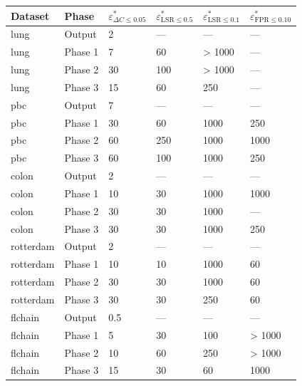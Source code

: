 \begin{tabular}{llllll}
  \toprule
Dataset & Phase & $\varepsilon^*_{\Delta C \leq 0.05}$ & $\varepsilon^*_{\text{LSR} \leq 0.5}$ & $\varepsilon^*_{\text{LSR} \leq 0.1}$ & $\varepsilon^*_{\text{FPR} \leq 0.10}$ \\ 
  \midrule
lung & Output & 2 & --- & --- & --- \\ 
  lung & Phase 1 & 7 & 60 & > 1000 & --- \\ 
  lung & Phase 2 & 30 & 100 & > 1000 & --- \\ 
  lung & Phase 3 & 15 & 60 & 250 & --- \\ 
  pbc & Output & 7 & --- & --- & --- \\ 
  pbc & Phase 1 & 30 & 60 & 1000 & 250 \\ 
  pbc & Phase 2 & 60 & 250 & 1000 & 1000 \\ 
  pbc & Phase 3 & 60 & 100 & 1000 & 250 \\ 
  colon & Output & 2 & --- & --- & --- \\ 
  colon & Phase 1 & 10 & 30 & 1000 & 1000 \\ 
  colon & Phase 2 & 30 & 30 & 1000 & --- \\ 
  colon & Phase 3 & 30 & 30 & 1000 & 250 \\ 
  rotterdam & Output & 2 & --- & --- & --- \\ 
  rotterdam & Phase 1 & 10 & 10 & 1000 & 60 \\ 
  rotterdam & Phase 2 & 30 & 30 & 1000 & 60 \\ 
  rotterdam & Phase 3 & 30 & 30 & 250 & 60 \\ 
  flchain & Output & 0.5 & --- & --- & --- \\ 
  flchain & Phase 1 & 5 & 30 & 100 & > 1000 \\ 
  flchain & Phase 2 & 10 & 60 & 250 & > 1000 \\ 
  flchain & Phase 3 & 15 & 30 & 60 & 1000 \\ 
   \bottomrule
\end{tabular}
